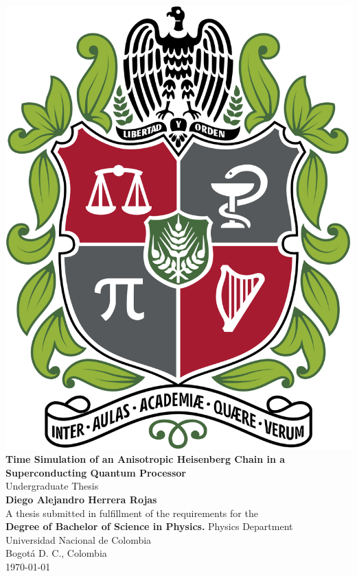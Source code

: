 \begin{titlepage}
  \begin{center}
    \vspace*{1cm}
    \includegraphics[scale=0.1]{Images/EscudoUnal.png}\\
    \vspace*{1cm}
    \huge
    \textbf{Time Simulation of an Anisotropic Heisenberg Chain in a Superconducting Quantum Processor}\\
    \vspace{0.5cm}
    \LARGE
    Undergraduate Thesis\\
    \vspace{1.5cm}
    \textbf{Diego Alejandro Herrera Rojas}\\
    \vfill
    \normalsize
    A thesis submitted in fulfillment of the requirements for the\\
    \textbf{Degree of Bachelor of Science in Physics.}
    \vfill
    \large
    Physics Department\\
    Universidad Nacional de Colombia\\
    Bogotá D. C., Colombia\\
    \yeardate\today
  \end{center}
\end{titlepage}
